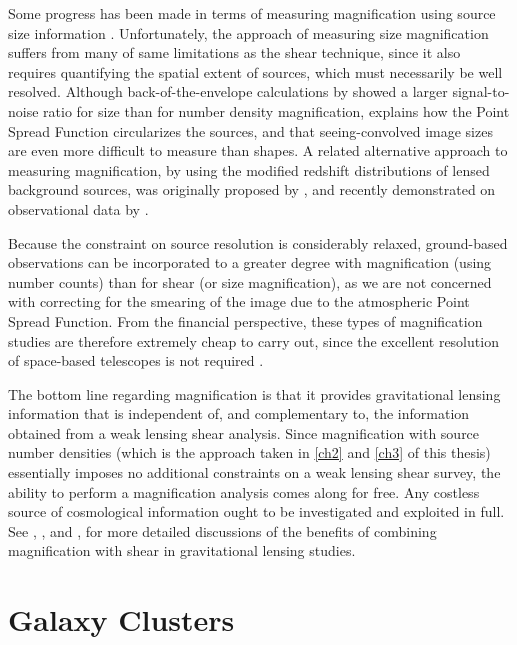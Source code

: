 Some progress has been made in terms of measuring magnification using source size information \citep{Huff14,Schmidt12}. Unfortunately, the approach of measuring size magnification suffers from many of same limitations as the shear technique, since it also requires quantifying the spatial extent of sources, which must necessarily be well resolved. Although back-of-the-envelope calculations by \citet{BS01} showed a larger signal-to-noise ratio for size than for number density magnification, \citet{Schneider06_WeakGravLens} explains how the Point Spread Function circularizes the sources, and that seeing-convolved image sizes are even more difficult to measure than shapes. A related alternative approach to measuring magnification, by using the modified redshift distributions of lensed background sources, was originally proposed by \citet{Broadhurst95}, and recently demonstrated on observational data by \citet{Coupon13}.

Because the constraint on source resolution is considerably relaxed, ground-based observations can be incorporated to a greater degree with magnification (using number counts) than for shear (or size magnification), as we are not concerned with correcting for the smearing of the image due to the atmospheric Point Spread Function. From the financial perspective, these types of magnification studies are therefore extremely cheap to carry out, since the excellent resolution of space-based telescopes is not required \citep{Hildebrandt09b}. 

The bottom line regarding magnification is that it provides gravitational lensing information that is independent of, and complementary to, the information obtained from a weak lensing shear analysis. Since magnification with source number densities (which is the approach taken in \autoref{ch2} and \autoref{ch3} of this thesis) essentially imposes no additional constraints on a weak lensing shear survey, the ability to perform a magnification analysis comes along for free. Any costless source of cosmological information ought to be investigated and exploited in full. See \citet{Waerbeke10}, \citet{RozoSchmidt10}, and \citet{Umetsu11}, for more detailed discussions of the benefits of combining magnification with shear in gravitational lensing studies.


\section{Galaxy Clusters}
\label{sec:Clusters}

